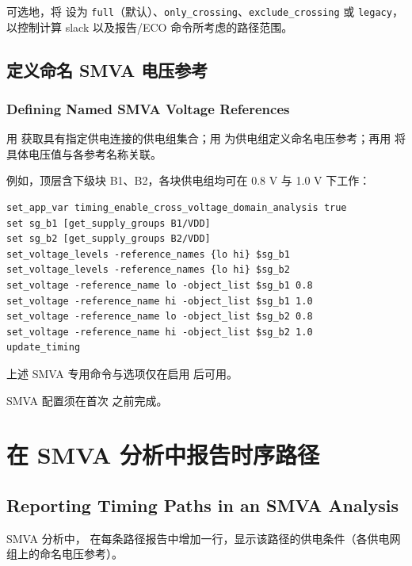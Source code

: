 可选地，将  设为 \texttt{full}（默认）、\texttt{only\_crossing}、\texttt{exclude\_crossing} 或 \texttt{legacy}，以控制计算 slack 以及报告/ECO 命令所考虑的路径范围。

\subsection{定义命名 SMVA 电压参考}
\subsubsection*{Defining Named SMVA Voltage References}

用  获取具有指定供电连接的供电组集合；用  为供电组定义命名电压参考；再用  将具体电压值与各参考名称关联。

例如，顶层含下级块 B1、B2，各块供电组均可在 0.8 V 与 1.0 V 下工作：
\begin{lstlisting}
set_app_var timing_enable_cross_voltage_domain_analysis true
set sg_b1 [get_supply_groups B1/VDD]
set sg_b2 [get_supply_groups B2/VDD]
set_voltage_levels -reference_names {lo hi} $sg_b1
set_voltage_levels -reference_names {lo hi} $sg_b2
set_voltage -reference_name lo -object_list $sg_b1 0.8
set_voltage -reference_name hi -object_list $sg_b1 1.0
set_voltage -reference_name lo -object_list $sg_b2 0.8
set_voltage -reference_name hi -object_list $sg_b2 1.0
update_timing
\end{lstlisting}

上述 SMVA 专用命令与选项仅在启用  后可用。

\begin{noteBox}
SMVA 配置须在首次  之前完成。
\end{noteBox}

\section{在 SMVA 分析中报告时序路径}
\subsection*{Reporting Timing Paths in an SMVA Analysis}

SMVA 分析中， 在每条路径报告中增加一行，显示该路径的供电条件（各供电网组上的命名电压参考）。

